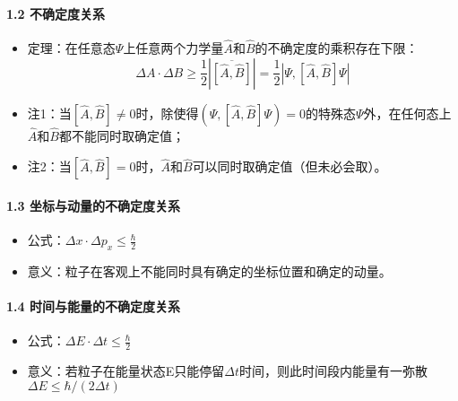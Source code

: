 \documentclass[UTF8,twocolumn]{ctexart}
\providecommand{\tightlist}{%
  \setlength{\itemsep}{0pt}\setlength{\parskip}{0pt}}
\let\oldparagraph\paragraph
\renewcommand{\paragraph}[1]{\oldparagraph{#1}\mbox{}}
\begin{document}
\hypertarget{ux4e0dux786eux5b9aux5ea6ux5173ux7cfb}{%
\paragraph{ 1.2
不确定度关系}\label{ux4e0dux786eux5b9aux5ea6ux5173ux7cfb}}

\begin{itemize}
\tightlist
\item
  定理：在任意态\(\Psi\)上任意两个力学量\(\hat{A}\)和\(\hat{B}\)的不确定度的乘积存在下限：
  \[\Delta A\cdot\Delta B\geq\frac{1}{2}|\overline{[\hat{A},\hat{B}]}|=\frac{1}{2}|\Psi,[\hat{A},\hat{B}]\Psi|\]
\item
  注1：当\([\hat{A},\hat{B}]\neq0\)时，除使得\((\Psi,[\hat{A},\hat{B}]\Psi)=0\)的特殊态\(\Psi\)外，在任何态上\(\hat{A}\)和\(\hat{B}\)都不能同时取确定值；
\item
  注2：当\([\hat{A},\hat{B}]=0\)时，\(\hat{A}\)和\(\hat{B}\)可以同时取确定值（但未必会取）。
\end{itemize}

\hypertarget{ux5750ux6807ux4e0eux52a8ux91cfux7684ux4e0dux786eux5b9aux5ea6ux5173ux7cfb}{%
\paragraph{ 1.3
坐标与动量的不确定度关系}\label{ux5750ux6807ux4e0eux52a8ux91cfux7684ux4e0dux786eux5b9aux5ea6ux5173ux7cfb}}

\begin{itemize}
\tightlist
\item
  公式：\(\Delta x\cdot\Delta p_x\leq\frac{\hbar}{2}\)
\item
  意义：粒子在客观上不能同时具有确定的坐标位置和确定的动量。
\end{itemize}

\hypertarget{ux65f6ux95f4ux4e0eux80fdux91cfux7684ux4e0dux786eux5b9aux5ea6ux5173ux7cfb}{%
\paragraph{ 1.4
时间与能量的不确定度关系}\label{ux65f6ux95f4ux4e0eux80fdux91cfux7684ux4e0dux786eux5b9aux5ea6ux5173ux7cfb}}

\begin{itemize}
\tightlist
\item
  公式：\(\Delta E\cdot\Delta t\leq\frac{\hbar}{2}\)
\item
  意义：若粒子在能量状态E只能停留\(\Delta t\)时间，则此时间段内能量有一弥散\(\Delta E\leq\hbar/(2\Delta t)\)
\end{itemize}
\end{document}
